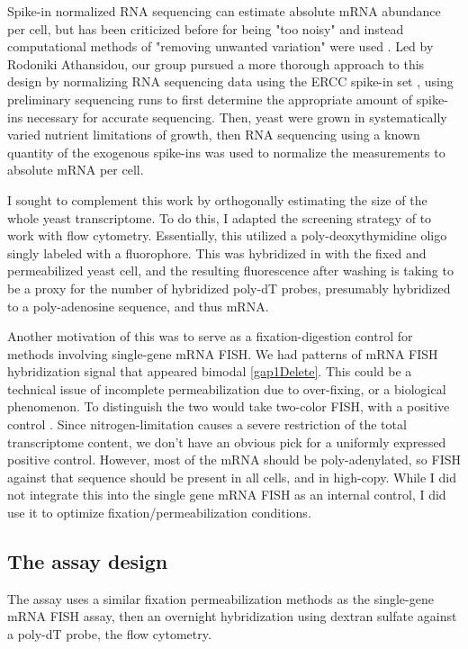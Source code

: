 Spike-in normalized RNA sequencing can estimate absolute mRNA
abundance per cell, but has been criticized before for
being "too noisy" and instead computational methods of "removing
unwanted variation" were used \parencite{}. 
Led by Rodoniki Athansidou, our group pursued a more thorough approach
to this design by normalizing RNA sequencing data using the ERCC
spike-in set \parencite{ERCC group}, using preliminary sequencing runs
to first determine the appropriate amount of spike-ins necessary for
accurate sequencing. Then, yeast were grown in systematically varied
nutrient limitations of growth, then RNA sequencing using a known
quantity of the exogenous spike-ins was used to normalize the
measurements to absolute mRNA per cell.

I sought to complement this work by orthogonally estimating the size 
of the whole yeast transcriptome. To do this, I adapted the screening 
strategy of \cite{amberg1992???} to work with flow cytometry. 
Essentially, this utilized a poly-deoxythymidine oligo singly labeled
with a fluorophore. This was hybridized in with the fixed and
permeabilized yeast cell, and the resulting fluorescence after washing
is taking to be a proxy for the number of hybridized poly-dT probes,
presumably hybridized to a poly-adenosine sequence, and thus mRNA.

Another motivation of this was to serve as a fixation-digestion
control for methods involving single-gene mRNA FISH.
We had patterns of mRNA FISH hybridization signal that appeared
bimodal \autoref{gap1Delete}. 
This could be a technical issue of incomplete permeabilization due to
over-fixing, or a biological phenomenon.
To distinguish the two would take two-color FISH, with a positive
control \parencite{regenbergtwocolor???}.
Since nitrogen-limitation causes a severe restriction of the total
transcriptome content, we don't have an obvious pick for a uniformly
expressed positive control. 
However, most of the mRNA should be poly-adenylated, so FISH against
that sequence should be present in all cells, and in high-copy.
While I did not integrate this into the single gene mRNA FISH as an
internal control, I did use it to optimize fixation/permeabilization 
conditions.

%
%
%
\subsection{The assay design}
%
%
%

The assay uses a similar fixation permeabilization methods as the
single-gene mRNA FISH assay, then an overnight hybridization using
dextran sulfate against a poly-dT probe, the flow cytometry.

